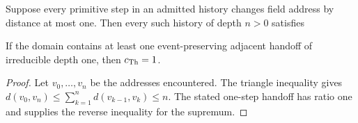 \setcounter{theorem}{1}
\begin{proposition}
Suppose every primitive step in an admitted history changes field address by distance at most one. Then every such history of depth $n>0$ satisfies

If the domain contains at least one event-preserving adjacent handoff of irreducible depth one, then $c_{\mathrm{Th}}=1$.
\end{proposition}
\begin{proof}
Let $v_0,\ldots,v_n$ be the addresses encountered. The triangle inequality gives
$d(v_0,v_n)\leq\sum_{k=1}^{n}d(v_{k-1},v_k)\leq n$.
The stated one-step handoff has ratio one and supplies the reverse inequality for the supremum.
\end{proof}
